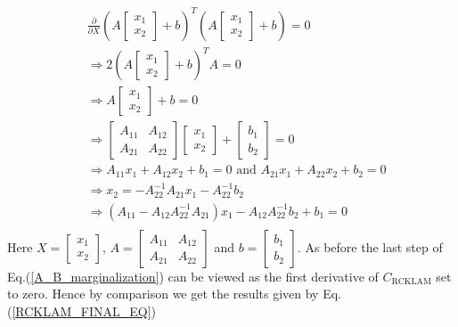\begin{equation}
\begin{split}
  &\frac{\partial}{\partial X} \left(A\begin{bmatrix}x_1 \\ x_2\end{bmatrix} + b\right)^T\left(A\begin{bmatrix}x_1 \\ x_2\end{bmatrix} + b\right) = 0 \\
  &\Rightarrow 2\left(A\begin{bmatrix}x_1 \\ x_2\end{bmatrix} + b\right)^TA = 0 \\
  &\Rightarrow A\begin{bmatrix}x_1 \\ x_2\end{bmatrix} + b = 0 \\
  &\Rightarrow \begin{bmatrix}A_{11} & A_{12}\\ A_{21} & A_{22}\end{bmatrix} \begin{bmatrix}x_1 \\ x_2\end{bmatrix} + \begin{bmatrix}b_1 \\ b_2\end{bmatrix} = 0 \\
  &\Rightarrow A_{11}x_1 + A_{12}x_2 + b_1 = 0 \text{ and } A_{21}x_1 + A_{22}x_2 + b_2 = 0 \\ 
  &\Rightarrow x_2 = -A_{22}^{-1}A_{21}x_1 - A_{22}^{-1}b_2 \\
  &\Rightarrow \left(A_{11} - A_{12}A_{22}^{-1}A_{21}\right)x_1-A_{12}A_{22}^{-1}b_2 + b_1 = 0 \\
\end{split}
\label{A_B_marginalization}
\end{equation}
Here $X = \begin{bmatrix}x_1 \\ x_2\end{bmatrix}$, $A = \begin{bmatrix}A_{11} & A_{12}\\ A_{21} & A_{22}\end{bmatrix}$ and $b = \begin{bmatrix}b_1 \\ b_2\end{bmatrix}$. As before the last step of Eq.(\ref{A_B_marginalization}) can be viewed as the first derivative of $C_\mathrm{RCKLAM}$ set to zero. Hence by comparison we get the results given by Eq.(\ref{RCKLAM_FINAL_EQ})

